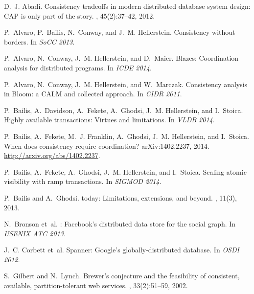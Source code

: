 \documentclass[9pt]{article}
\begin{document}


\begin{thebibliography}{10}

D.~J. Abadi.
\newblock Consistency tradeoffs in modern distributed database system design:
  {CAP} is only part of the story.
, 45(2):37--42, 2012.

P.~Alvaro, P.~Bailis, N.~Conway, and J.~M. Hellerstein.
\newblock Consistency without borders.
\newblock In {\em SoCC 2013}.

P.~Alvaro, N.~Conway, J.~M. Hellerstein, and D.~Maier.
\newblock Blazes: Coordination analysis for distributed programs.
\newblock In {\em ICDE 2014}.

P.~Alvaro, N.~Conway, J.~M. Hellerstein, and W.~Marczak.
\newblock Consistency analysis in {Bloom}: a {CALM} and collected approach.
\newblock In {\em CIDR 2011}.

P.~Bailis, A.~Davidson, A.~Fekete, A.~Ghodsi, J.~M. Hellerstein, and I.~Stoica.
\newblock Highly available transactions: Virtues and limitations.
\newblock In {\em VLDB 2014}.

P.~Bailis, A.~Fekete, M.~J. Franklin, A.~Ghodsi, J.~M. Hellerstein, and
  I.~Stoica.
\newblock When does consistency require coordination?
\newblock arXiv:1402.2237, 2014.
\newblock \url{http://arxiv.org/abs/1402.2237}.

P.~Bailis, A.~Fekete, A.~Ghodsi, J.~M. Hellerstein, and I.~Stoica.
\newblock Scaling atomic visibility with ramp transactions.
\newblock In {\em SIGMOD 2014}.

P.~Bailis and A.~Ghodsi.
 today: Limitations, extensions, and beyond.
, 11(3), 2013.

N.~Bronson et~al.
: {Facebook's} distributed data store for the social graph.
\newblock In {\em USENIX ATC 2013}.

J.~C. Corbett et~al.
\newblock Spanner: Google's globally-distributed database.
\newblock In {\em OSDI 2012}.

S.~Gilbert and N.~Lynch.
\newblock Brewer's conjecture and the feasibility of consistent, available,
  partition-tolerant web services.
, 33(2):51--59, 2002.


\end{thebibliography}
\end{document}
